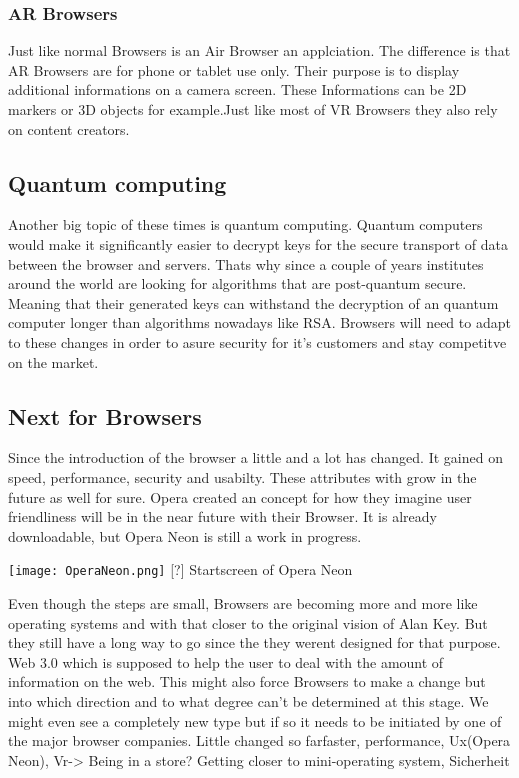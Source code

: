 \documentclass[runningheads]{llncs}
\begin{document}
			\subsubsection{AR Browsers}
				Just like normal Browsers is an Air Browser an applciation. The difference is that AR Browsers are for phone or tablet use only. Their purpose is to display additional informations on a camera screen. These Informations can be 2D markers or 3D objects for example.Just like most of VR Browsers they also rely on content creators. 
		\subsection{Quantum computing}
			Another big topic of these times is quantum computing. Quantum computers would make it significantly easier to decrypt keys for the secure transport of data between the browser and servers. Thats why since a couple of years institutes around the world are looking for algorithms that are post-quantum secure. Meaning that their generated keys can withstand the decryption of an quantum computer longer than algorithms nowadays like RSA. Browsers will need to adapt to these changes in order to asure security for it's customers and stay competitve on the market. 
		\subsection{Next for Browsers}
			Since the introduction of the browser a little and a lot has changed. It gained on speed, performance, security and usabilty. These attributes with grow in the future as well for sure. 
			Opera created an concept for how they imagine user friendliness will be in the near future with their Browser. It is already downloadable, but Opera Neon is still a work in progress.
		 	\begin{center}
		 		\texttt{[image: OperaNeon.png]}
		 		[?]	Startscreen of Opera Neon
		 	\end{center}
		 	
			Even though the steps are small, Browsers are becoming more and more like operating systems and with that closer to the original vision of Alan Key. But they still have a long way to go since the they werent designed for that purpose.
			Web 3.0 which is supposed to help the user to deal with the amount of information on the web. This might also force Browsers to make a change but into which direction and to what degree can't be determined at this stage. We might even see a completely new type but if so it needs to be initiated by one of the major browser companies. 	 
			Little changed so farfaster, performance, Ux(Opera Neon), Vr-> Being in a store? Getting closer to mini-operating system, Sicherheit
\end{document}
